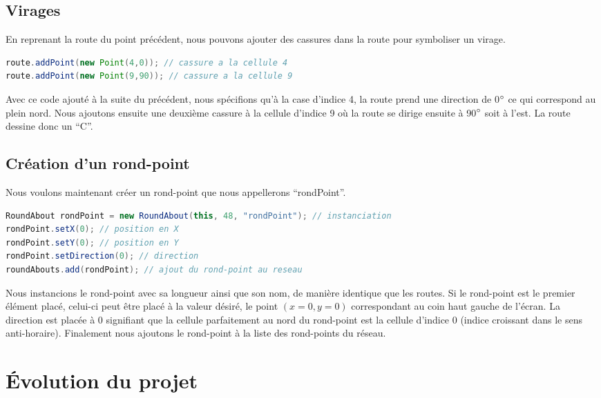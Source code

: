 \documentclass[a4paper,11pt, titlepage]{extarticle}
\begin{document}
\subsection{Virages}

En reprenant la route du point précédent, nous pouvons ajouter des cassures dans la route pour symboliser un virage.

\begin{lstlisting}[language=Java]
route.addPoint(new Point(4,0)); // cassure a la cellule 4
route.addPoint(new Point(9,90)); // cassure a la cellule 9
\end{lstlisting}

Avec ce code ajouté à la suite du précédent, nous spécifions qu'à la case d'indice 4, la route prend une direction de 0$\degree$ ce qui correspond au plein nord. Nous ajoutons ensuite une deuxième cassure à la cellule d'indice 9 où la route se dirige ensuite à 90$\degree$ soit à l'est. La route dessine donc un ``C''.

\subsection{Création d'un rond-point}

Nous voulons maintenant créer un rond-point que nous appellerons ``rondPoint''.

\begin{lstlisting}[language=Java]
RoundAbout rondPoint = new RoundAbout(this, 48, "rondPoint"); // instanciation
rondPoint.setX(0); // position en X
rondPoint.setY(0); // position en Y
rondPoint.setDirection(0); // direction
roundAbouts.add(rondPoint); // ajout du rond-point au reseau
\end{lstlisting}

Nous instancions le rond-point avec sa longueur ainsi que son nom, de manière identique que les routes. Si le rond-point est le premier élément placé, celui-ci peut être placé à la valeur désiré, le point $(x=0,y=0)$ correspondant au coin haut gauche de l'écran. La direction est placée à 0 signifiant que la cellule parfaitement au nord du rond-point est la cellule d'indice 0 (indice croissant dans le sens anti-horaire). Finalement nous ajoutons le rond-point à la liste des rond-points du réseau.

\newpage

\section{Évolution du projet}
\end{document}
